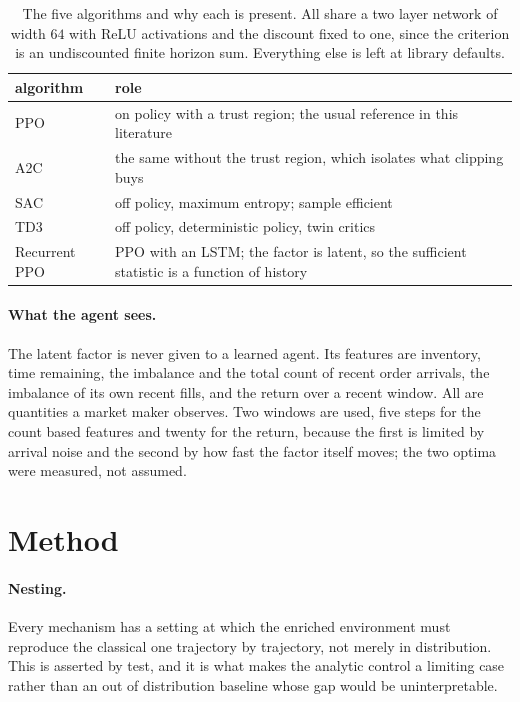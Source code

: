 \documentclass[10pt,twocolumn]{article}
\begin{document}
\begin{table}[t]
\small\centering
\caption{The five algorithms and why each is present. All share a two layer network of width $64$ with ReLU
activations and the discount fixed to one, since the criterion is an undiscounted finite horizon sum. Everything
else is left at library defaults.}
\label{tab:agents}
\begin{tabular}{lp{4.6cm}}
\toprule
algorithm & role \\
\midrule
PPO \citep{schulman2017ppo} & on policy with a trust region; the usual reference in this literature \\
A2C \citep{mnih2016a3c} & the same without the trust region, which isolates what clipping buys \\
SAC \citep{haarnoja2018sac} & off policy, maximum entropy; sample efficient \\
TD3 \citep{fujimoto2018td3} & off policy, deterministic policy, twin critics \\
Recurrent PPO & PPO with an LSTM; the factor is latent, so the sufficient statistic is a function of history \\
\bottomrule
\end{tabular}
\end{table}

\paragraph{What the agent sees.}
The latent factor is never given to a learned agent. Its features are inventory, time remaining, the imbalance and
the total count of recent order arrivals, the imbalance of its own recent fills, and the return over a recent
window. All are quantities a market maker observes. Two windows are used, five steps for the count based features
and twenty for the return, because the first is limited by arrival noise and the second by how fast the factor
itself moves; the two optima were measured, not assumed.

\section{Method}

\paragraph{Nesting.}
Every mechanism has a setting at which the enriched environment must reproduce the classical one trajectory by
trajectory, not merely in distribution. This is asserted by test, and it is what makes the analytic control a
limiting case rather than an out of distribution baseline whose gap would be uninterpretable.
\end{document}
